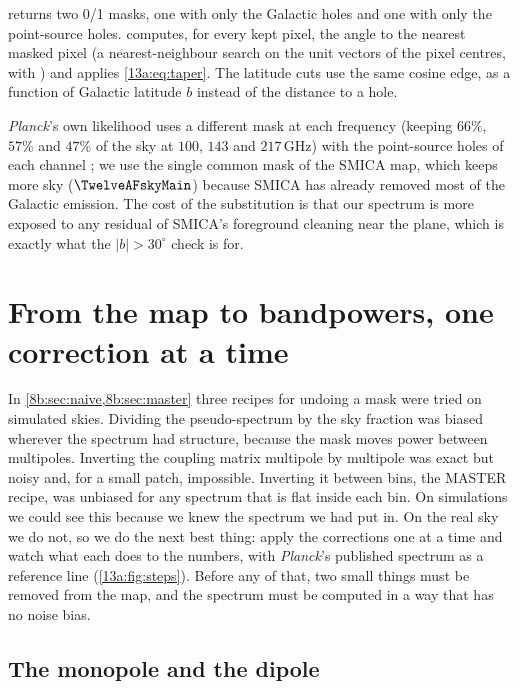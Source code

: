 
\noindent {} returns two 0/1 masks, one with only the Galactic holes and one with only the
point-source holes.  computes, for every kept pixel, the angle to the nearest masked
pixel (a nearest-neighbour search on the unit vectors of the pixel centres, with )
and applies \eqref{13a:eq:taper}. The latitude cuts use the same cosine edge, as a function of Galactic latitude
$b$ instead of the distance to a hole.

\textit{Planck}'s own likelihood uses a different mask at each frequency (keeping $66\%$, $57\%$ and $47\%$
of the sky at $100$, $143$ and $217$\,GHz) with the point-source holes of each channel
\cite[§3.2.2, Fig.~29]{Planck2018V}; we use the single common mask of the SMICA map, which keeps more sky
($\TwelveAFskyMain$) because SMICA has already removed most of the Galactic emission. The cost of the
substitution is that our spectrum is more exposed to any residual of SMICA's foreground cleaning near the
plane, which is exactly what the $|b|>30^\circ$ check is for.
\section{From the map to bandpowers, one correction at a time}
\label{13a:sec:bandpowers}

In \cref{8b:sec:naive,8b:sec:master} three recipes for undoing a mask were tried on simulated skies.
Dividing the pseudo-spectrum by the sky fraction was biased wherever the spectrum had structure, because
the mask moves power between multipoles. Inverting the coupling matrix multipole by multipole was exact
but noisy and, for a small patch, impossible. Inverting it between bins, the MASTER recipe, was unbiased
for any spectrum that is flat inside each bin. On simulations we could see this because we knew the
spectrum we had put in. On the real sky we do not, so we do the next best thing: apply the corrections one at a
time and watch what each does to the numbers, with \textit{Planck}'s published spectrum as a reference
line (\cref{13a:fig:steps}). Before any of that, two small things must be removed from the map, and the
spectrum must be computed in a way that has no noise bias.

\subsection{The monopole and the dipole}
\label{13a:sec:monodipole}

